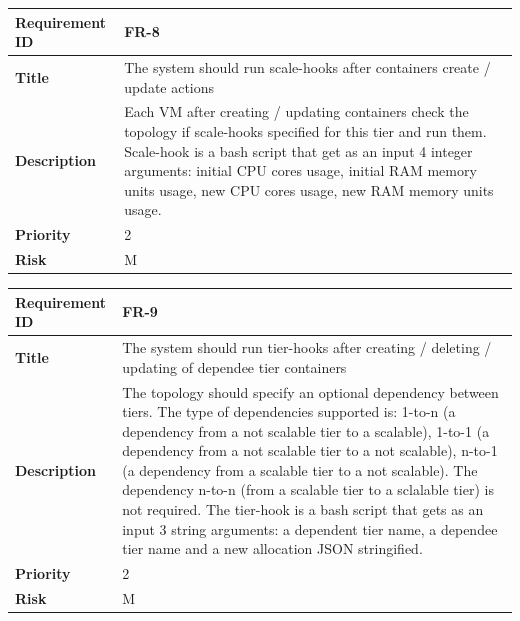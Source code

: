 \begin{table}[ht]
  \begin{tabular}{|p{3.5cm}|p{8cm}|}
  \hline
    \textbf{Requirement ID}  & FR-8 \\
  \hline
    \textbf{Title}  & \begin{sloppypar}The system should run scale-hooks after containers create / update actions \end{sloppypar}\\
  \hline
    \textbf{Description}  & \begin{sloppypar}Each VM after creating / updating containers check the topology if scale-hooks specified for this tier and run them. Scale-hook is a bash script that get as an input 4 integer arguments: initial CPU cores usage, initial RAM memory units usage, new CPU cores usage, new RAM memory units usage.\end{sloppypar}\\
  \hline
    \textbf{Priority}  & 2\\
  \hline
    \textbf{Risk}  & M \\
  \hline
  \end{tabular}
\end{table}

\begin{table}[ht]
  \begin{tabular}{|p{3.5cm}|p{8cm}|}
  \hline
    \textbf{Requirement ID}  & FR-9 \\
  \hline
    \textbf{Title}  & \begin{sloppypar}The system should run tier-hooks after creating / deleting / updating of dependee tier containers \end{sloppypar}\\
  \hline
    \textbf{Description}  & \begin{sloppypar}The topology should specify an optional dependency between tiers. The type of dependencies supported is: 1-to-n (a dependency from a not scalable tier to a scalable), 1-to-1 (a dependency from a not scalable tier to a not scalable), n-to-1 (a dependency from a scalable tier to a not scalable). The dependency n-to-n (from a scalable tier to a sclalable tier) is not required. The tier-hook is a bash script that gets as an input 3 string arguments: a dependent tier name, a dependee tier name and a new allocation JSON stringified. \end{sloppypar}\\
  \hline
    \textbf{Priority}  & 2\\
  \hline
    \textbf{Risk}  & M \\
  \hline
  \end{tabular}
\end{table}

